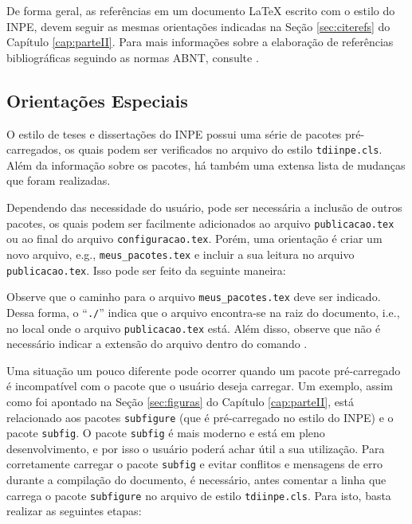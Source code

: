 De forma geral, as referências em um documento \LaTeX{} escrito com o estilo do INPE, devem seguir as mesmas orientações indicadas na Seção \ref{sec:citerefs} do Capítulo \ref{cap:parteII}. Para mais informações sobre a elaboração de referências bibliográficas seguindo as normas ABNT, consulte .

\subsection{Orientações Especiais}
\label{sec:oriesp}

O estilo de teses e dissertações do INPE possui uma série de pacotes pré-carregados, os quais podem ser verificados no arquivo do estilo {\tt tdiinpe.cls}. Além da informação sobre os pacotes, há também uma extensa lista de mudanças que foram realizadas.

Dependendo das necessidade do usuário, pode ser necessária a inclusão de outros pacotes, os quais podem ser facilmente adicionados ao arquivo {\tt publicacao.tex} ou ao final do arquivo {\tt configuracao.tex}. Porém, uma orientação é criar um novo arquivo, e.g., {\tt meus\_pacotes.tex} e incluir a sua leitura no arquivo {\tt publicacao.tex}. Isso pode ser feito da seguinte maneira:

\begingroup
\renewcommand{\labelenumi}{\arabic{enumi}.}
\endgroup

Observe que o caminho para o arquivo {\tt meus\_pacotes.tex} deve ser indicado. Dessa forma, o ``{\tt ./}'' indica que o arquivo encontra-se na raiz do documento, i.e., no local onde o arquivo {\tt publicacao.tex} está. Além disso, observe que não é necessário indicar a extensão do arquivo dentro do comando \texttt{}.

Uma situação um pouco diferente pode ocorrer quando um pacote pré-carregado é incompatível com o pacote que o usuário deseja carregar. Um exemplo, assim como foi apontado na Seção \ref{sec:figuras} do Capítulo \ref{cap:parteII}, está relacionado aos pacotes {\tt subfigure} (que é pré-carregado no estilo do INPE) e o pacote {\tt subfig}. O pacote {\tt subfig} é mais moderno e está em pleno desenvolvimento, e por isso o usuário poderá achar útil a sua utilização. Para corretamente carregar o pacote {\tt subfig} e evitar conflitos e mensagens de erro durante a compilação do documento, é necessário, antes comentar a linha que carrega o pacote {\tt subfigure} no arquivo de estilo {\tt tdiinpe.cls}. Para isto, basta realizar as seguintes etapas:


